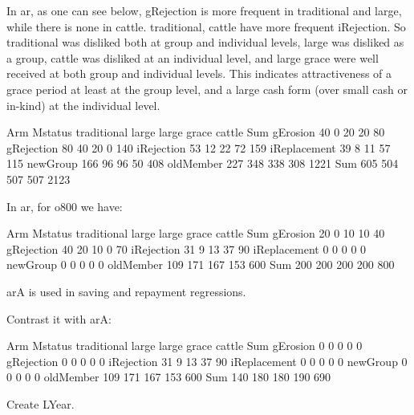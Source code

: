 In \textsf{ar}, as one can see below, \textsf{gRejection} is more frequent in \textsf{traditional} and \textsf{large}, while there is none in \textsf{cattle}. \textsf{traditional, cattle} have more frequent \textsf{iRejection}. So \textsf{traditional} was disliked both at group and individual levels, \textsf{large} was disliked as a group, \textsf{cattle} was disliked at an individual level, and \textsf{large grace} were well received at both group and individual levels. This indicates attractiveness of a grace period at least at the group level, and a large cash form (over small cash or in-kind) at the individual level.
\begin{Schunk}
\begin{Soutput}
              Arm
Mstatus        traditional large large grace cattle  Sum
  gErosion              40     0          20     20   80
  gRejection            80    40          20      0  140
  iRejection            53    12          22     72  159
  iReplacement          39     8          11     57  115
  newGroup             166    96          96     50  408
  oldMember            227   348         338    308 1221
  Sum                  605   504         507    507 2123
\end{Soutput}
\end{Schunk}
In \textsf{ar}, for \textsf{o800} we have:
\begin{Schunk}
\begin{Soutput}
              Arm
Mstatus        traditional large large grace cattle Sum
  gErosion              20     0          10     10  40
  gRejection            40    20          10      0  70
  iRejection            31     9          13     37  90
  iReplacement           0     0           0      0   0
  newGroup               0     0           0      0   0
  oldMember            109   171         167    153 600
  Sum                  200   200         200    200 800
\end{Soutput}
\end{Schunk}



\textsf{arA} is used in saving and repayment regressions. \gobblepars

Contrast it with \textsf{arA}:
\begin{Schunk}
\begin{Soutput}
              Arm
Mstatus        traditional large large grace cattle Sum
  gErosion               0     0           0      0   0
  gRejection             0     0           0      0   0
  iRejection            31     9          13     37  90
  iReplacement           0     0           0      0   0
  newGroup               0     0           0      0   0
  oldMember            109   171         167    153 600
  Sum                  140   180         180    190 690
\end{Soutput}
\end{Schunk}
Create \textsf{LYear}.


